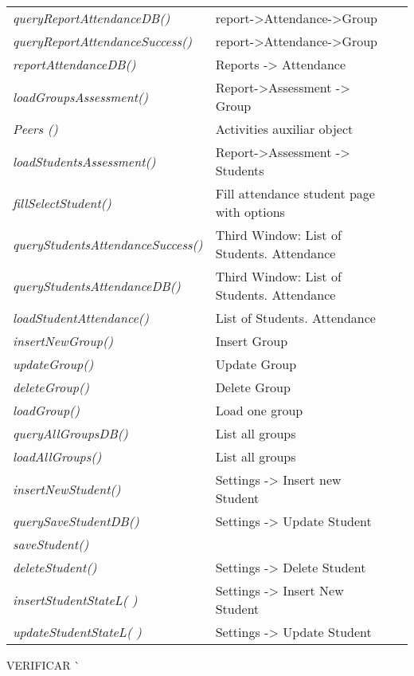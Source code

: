 \begin{bclogo}[couleur=orange!30,logo=\bcbook, arrondi=0.1,ombre=true ]
\begin{tabular}{lll}
\emph { queryReportAttendanceDB() }          & report->Attendance->Group \\
\emph { queryReportAttendanceSuccess()}     & report->Attendance->Group \\
\emph { reportAttendanceDB()  }              & {  Reports -> Attendance }\\
\emph { loadGroupsAssessment() }            & Report->Assessment ->  Group\\
\emph { Peers () }                          & Activities auxiliar object \\
\emph { loadStudentsAssessment() }      & Report->Assessment ->  Students\\
\emph {  fillSelectStudent() }          & {  Fill attendance student page with options } \\
\emph { queryStudentsAttendanceSuccess()}&    {   Third Window: List of Students.  Attendance }\\
\emph { queryStudentsAttendanceDB() }    & {  Third Window: List of Students.  Attendance }\\
\emph { loadStudentAttendance()  }      &  List of Students.  Attendance   \\
\emph { insertNewGroup()}               &{ Insert Group }   \\
\emph { updateGroup()  }                & {  Update Group  }\\
\emph { deleteGroup() }                 &{ Delete Group } \\
\emph { loadGroup()             }        & { Load  one group } \\
\emph { queryAllGroupsDB()      }        & { List all groups }  \\
\emph { loadAllGroups()         }        & {  List all groups }  \\
\emph { insertNewStudent() }            & { Settings -> Insert new Student  } \\
\emph { querySaveStudentDB() }          &  Settings -> Update Student \\
\emph { saveStudent() }                 & { } \\
\emph { deleteStudent()}                & { Settings -> Delete Student } \\
\emph { insertStudentStateL( ) }         & { Settings -> Insert New Student  }\\
\emph { updateStudentStateL( )  }        & { Settings ->  Update Student }\\



\end{tabular}

\end{bclogo}  
{\huge  VERIFICAR ^^ }


